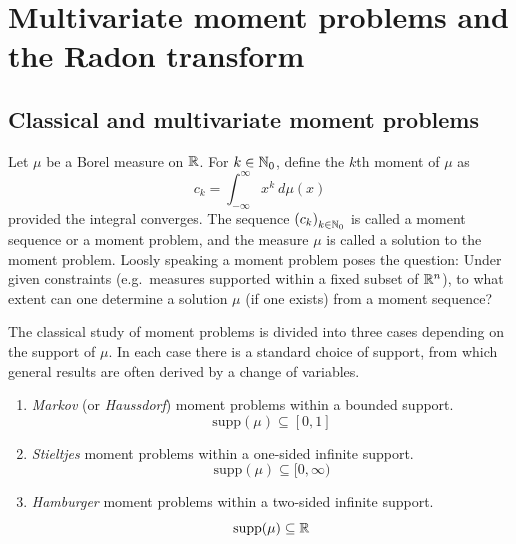

\chapter{Multivariate moment problems and the Radon transform}{}

\section{Classical and multivariate moment problems}
Let $\mu$ be a Borel measure on $\mathbb{R}$. For $k \in \mathbb{N}_0$, define the $k$th moment of $\mu$ as
\[
  c_k = \int_{-\infty}^\infty x^k ~d\mu(x)
\]
provided the integral converges. The sequence ${(c_k)}_{k \in \mathbb{N}_0}$ is called a moment sequence or a moment problem, and the measure $\mu$ is called a solution to the moment problem. Loosly speaking a moment problem poses the question: Under given constraints (e.g.\ measures supported within a fixed subset of $\mathbb{R}^n$), to what extent can one determine a solution $\mu$ (if one exists) from a moment sequence? 

The classical study of moment problems is divided into three cases depending on the support of $\mu$. In each case there is a standard choice of support, from which general results are often derived by a change of variables.
\begin{enumerate}[label=]
  \item \emph{Markov} (or \emph{Haussdorf}) moment problems within a bounded support.
  \[
    \text{supp}(\mu) \subseteq [0,1]
  \]
  \item \emph{Stieltjes} moment problems within a one-sided infinite support. 
  \[
    \text{supp}(\mu) \subseteq [0,\infty)
  \]
  \item \emph{Hamburger} moment problems within a two-sided infinite support.
  \[
    \text{supp}(\mu) \subseteq \mathbb{R}
  \]
\end{enumerate}


